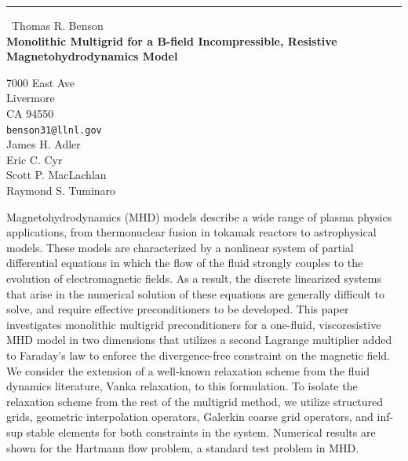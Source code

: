\documentclass{report}
\begin{document}
\begin{center}
\rule{6in}{1pt} \
{\large Thomas R. Benson \\
{\bf Monolithic Multigrid for a B-field Incompressible, Resistive Magnetohydrodynamics Model}}

7000 East Ave \\ Livermore \\ CA 94550
\\
{\tt benson31@llnl.gov}\\
James H. Adler\\
Eric C. Cyr\\
Scott P. MacLachlan\\
Raymond S. Tuminaro\end{center}

Magnetohydrodynamics (MHD) models describe a wide range of plasma physics
applications, from thermonuclear fusion in tokamak reactors to
astrophysical models. These models are characterized by a nonlinear
system of partial differential equations in which the flow of the fluid
strongly couples to the evolution of electromagnetic fields. As a result,
the discrete linearized systems that arise in
the numerical solution of these equations are generally difficult to
solve, and require effective preconditioners to be developed. This paper
investigates monolithic multigrid preconditioners for a one-fluid,
viscoresistive MHD model in two dimensions that utilizes a second
Lagrange multiplier added to Faraday's law to enforce the divergence-free
constraint on the magnetic field. We consider the extension of a
well-known relaxation scheme from the fluid dynamics literature, Vanka
relaxation, to this formulation. To isolate the relaxation scheme from
the rest of the multigrid method, we utilize structured grids, geometric
interpolation operators, Galerkin coarse grid operators, and inf-sup
stable elements for both constraints in the system. Numerical results are
shown for the Hartmann flow problem, a standard test problem in MHD.
\end{document}
